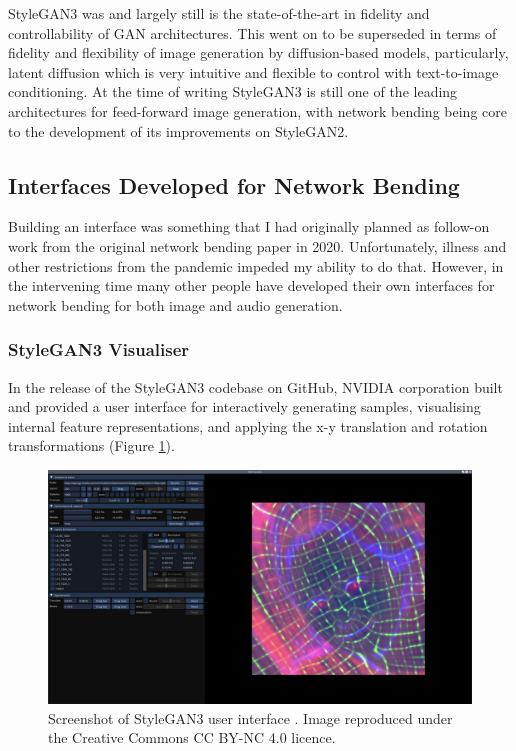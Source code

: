 StyleGAN3 was and largely still is the state-of-the-art in fidelity and controllability of GAN architectures. 
This went on to be superseded in terms of fidelity and flexibility of image generation by diffusion-based models, particularly, latent diffusion \citep{rombach2022high} which is very intuitive and flexible to control with text-to-image conditioning.
At the time of writing StyleGAN3 is still one of the leading architectures for feed-forward image generation, with network bending being core to the development of its improvements on StyleGAN2. 

\subsection{Interfaces Developed for Network Bending}
\label{c7:subsec:net-bend-interfaces}

Building an interface was something that I had originally planned as follow-on work from the original network bending paper in 2020. 
Unfortunately, illness and other restrictions from the pandemic impeded my ability to do that. 
However, in the intervening time many other people have developed their own interfaces for network bending for both image and audio generation.

\subsubsection{StyleGAN3 Visualiser}

In the release of the StyleGAN3 codebase on GitHub, NVIDIA corporation built and provided a user interface for interactively generating samples, visualising internal feature representations, and applying the x-y translation and rotation transformations (Figure \ref{fig:c7:stylegan3-interface}).  

\begin{figure}[!htb]
    \centering
    \captionsetup{justification=centering}
    \includegraphics[width=1\textwidth]{figures/c7_impact/net-bend-technical/stylegan3-vis-interface.png}
    \caption[StyleGAN3 user interface]{Screenshot of StyleGAN3 user interface \citep{karras2021alias}. Image reproduced under the Creative Commons CC BY-NC 4.0 licence.}
    \label{fig:c7:stylegan3-interface}
\end{figure}


